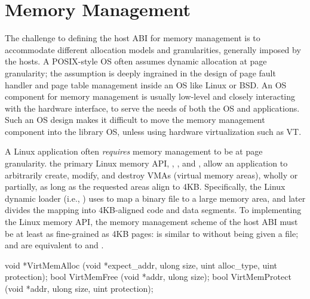 \section{Memory Management}
\label{sec:abi:memory}


The challenge to defining the host ABI for memory management
is to accommodate different allocation models and granularities, generally imposed by the hosts.
A POSIX-style OS often assumes dynamic allocation at page granularity;
the assumption is deeply ingrained in the design of page fault handler and page table management
inside an OS like Linux or BSD.
An OS component for memory management
is usually low-level and closely interacting with the hardware interface,
to serve the needs of both the OS and applications.
Such an OS design makes it difficult to move the memory management
component into the library OS, unless using hardware virtualization such as VT.



A Linux application often {\em requires} memory management to be
at page granularity.
the primary Linux memory API,
, , and ,
allow an application
to arbitrarily create, modify, and destroy VMAs (virtual memory areas),
wholly or partially,
as long as the requested areas align to
4KB.
Specifically, the Linux dynamic loader (i.e., ) %
uses  to map a binary file to a large memory area,
and later divides the mapping into 4KB-aligned code and data segments.
To implementing the Linux memory API,
the memory management scheme of the host ABI
must be at least as fine-grained as 4KB pages:
 is similar to  without being given a file;
 and 
are equivalent to
 and .


\begin{paldef}
void *VirtMemAlloc   (void *expect_addr, ulong size,
                      uint alloc_type, uint protection);
bool  VirtMemFree    (void *addr, ulong size);
bool  VirtMemProtect (void *addr, ulong size,
                      uint protection);
\end{paldef}





